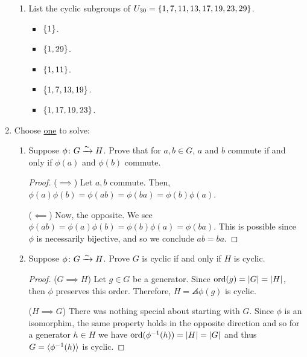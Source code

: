 \documentclass{article}
\begin{document}
\begin{enumerate}[start=1,label={(\arabic*)}]
\begin{enumerate}[start=1,label={(\alph*)}]
          \item List the cyclic subgroups of $U_{30} = \lbrace1, 7, 11, 13, 17, 19, 23, 29\rbrace$.

                \begin{itemize}
                  \item $\lbrace1\rbrace$.
                  \item $\lbrace1, 29\rbrace$.
                  \item $\lbrace1, 11\rbrace$.
                  \item $\lbrace1, 7, 13, 19\rbrace$.
                  \item $\lbrace1, 17, 19, 23\rbrace$.
                \end{itemize}

        \end{enumerate}

  \item Choose \underline{one} to solve:

        \begin{enumerate}[start=1,label={(\alph*)}]
          \item Suppose $\phi \colon G \xrightarrow{\sim} H$.
                Prove that for $a, b \in G$, $a$ and $b$ commute if and only if $\phi(a)$ and $\phi(b)$ commute.

                \begin{proof}
                  ($\implies$)
                  Let $a, b$ commute. Then, $\phi(a)\phi(b) = \phi(ab) = \phi(ba) = \phi(b)\phi(a)$.

                  ($\impliedby$)
                  Now, the opposite. We see $\phi(ab) = \phi(a)\phi(b) = \phi(b)\phi(a) = \phi(ba)$.
                  This is possible since $\phi$ is necessarily bijective, and so we conclude $ab = ba$.
                \end{proof}

          \item Suppose $\phi \colon G \xrightarrow{\sim} H$. Prove $G$ is cyclic if and only if $H$ is cyclic.

                \begin{proof}
                  ($G \implies H$)
                  Let $g \in G$ be a generator. Since $\operatorname{ord}(g) = \lvert G\rvert = \lvert H\rvert$, then $\phi$ preserves this order. Therefore, $H = \angles{\phi(g)}$ is cyclic.

                  ($H \implies G$)
                  There was nothing special about starting with $G$.
                  Since $\phi$ is an isomorphim, the same property holds in the opposite direction
                  and so for a generator $h \in H$ we have $\operatorname{ord}(\phi^{-1}(h)) = \lvert H\rvert = \lvert G\rvert$ and thus $G = \langle\phi^{-1}(h)\rangle$ is cyclic.
                \end{proof}


\end{enumerate}
\end{enumerate}
\end{document}

